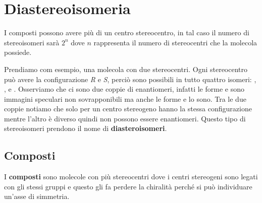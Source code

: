 \vspace{-20pt}
\section{Diastereoisomeria}
I composti possono avere più di un centro stereocentro, in tal caso il numero di stereoisomeri sarà \(2^n\) dove \(n\) rappresenta il numero di stereocentri che la molecola possiede.

Prendiamo com esempio, una molecola con due stereocentri. Ogni stereocentro può avere la configurazione \textit{R} e \textit{S}, perciò sono possibili in tutto quattro isomeri: , , e . Osserviamo che ci sono due coppie di enantiomeri, infatti le forme  e  sono immagini speculari non sovrapponibili ma anche le forme  e  lo sono.
Tra le due coppie notiamo che solo per un centro stereogeno hanno la stessa configurazione mentre l'altro è diverso quindi non possono essere enantiomeri. Questo tipo di stereoisomeri prendono il nome di \textbf{diasteroisomeri}.

\subsection{Composti \texorpdfstring{\meso}{meso}}
I \textbf{composti \meso} sono molecole con più stereocentri dove i centri stereogeni sono legati con gli stessi gruppi e questo gli fa perdere la chiralità perché si può individuare un'asse di simmetria.

